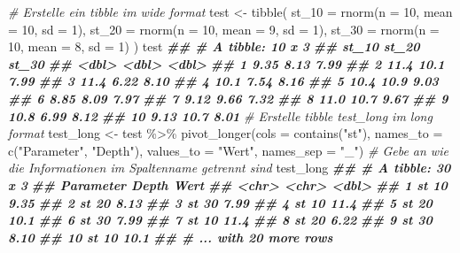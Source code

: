 \documentclass[
]{article}
\newenvironment{Shaded}{\begin{snugshade}}{\end{snugshade}}
\newcommand{\AttributeTok}[1]{\textcolor[rgb]{0.77,0.63,0.00}{#1}}
\newcommand{\CommentTok}[1]{\textcolor[rgb]{0.56,0.35,0.01}{\textit{#1}}}
\newcommand{\DecValTok}[1]{\textcolor[rgb]{0.00,0.00,0.81}{#1}}
\newcommand{\DocumentationTok}[1]{\textcolor[rgb]{0.56,0.35,0.01}{\textbf{\textit{#1}}}}
\newcommand{\FunctionTok}[1]{\textcolor[rgb]{0.00,0.00,0.00}{#1}}
\newcommand{\NormalTok}[1]{#1}
\newcommand{\OtherTok}[1]{\textcolor[rgb]{0.56,0.35,0.01}{#1}}
\newcommand{\SpecialCharTok}[1]{\textcolor[rgb]{0.00,0.00,0.00}{#1}}
\newcommand{\StringTok}[1]{\textcolor[rgb]{0.31,0.60,0.02}{#1}}
\begin{document}
\begin{Shaded}
\begin{Highlighting}[]
\CommentTok{\# Erstelle ein tibble im wide format}
\NormalTok{test }\OtherTok{\textless{}{-}} \FunctionTok{tibble}\NormalTok{(}
  \AttributeTok{st\_10 =} \FunctionTok{rnorm}\NormalTok{(}\AttributeTok{n =} \DecValTok{10}\NormalTok{, }\AttributeTok{mean =} \DecValTok{10}\NormalTok{, }\AttributeTok{sd =} \DecValTok{1}\NormalTok{), }
  \AttributeTok{st\_20 =} \FunctionTok{rnorm}\NormalTok{(}\AttributeTok{n =} \DecValTok{10}\NormalTok{, }\AttributeTok{mean =} \DecValTok{9}\NormalTok{, }\AttributeTok{sd =} \DecValTok{1}\NormalTok{), }
  \AttributeTok{st\_30 =} \FunctionTok{rnorm}\NormalTok{(}\AttributeTok{n =} \DecValTok{10}\NormalTok{, }\AttributeTok{mean =} \DecValTok{8}\NormalTok{, }\AttributeTok{sd =} \DecValTok{1}\NormalTok{) }
\NormalTok{)}
\NormalTok{test}
\DocumentationTok{\#\# \# A tibble: 10 x 3}
\DocumentationTok{\#\#    st\_10 st\_20 st\_30}
\DocumentationTok{\#\#    \textless{}dbl\textgreater{} \textless{}dbl\textgreater{} \textless{}dbl\textgreater{}}
\DocumentationTok{\#\#  1  9.35  8.13  7.99}
\DocumentationTok{\#\#  2 11.4  10.1   7.99}
\DocumentationTok{\#\#  3 11.4   6.22  8.10}
\DocumentationTok{\#\#  4 10.1   7.54  8.16}
\DocumentationTok{\#\#  5 10.4  10.9   9.03}
\DocumentationTok{\#\#  6  8.85  8.09  7.97}
\DocumentationTok{\#\#  7  9.12  9.66  7.32}
\DocumentationTok{\#\#  8 11.0  10.7   9.67}
\DocumentationTok{\#\#  9 10.8   6.99  8.12}
\DocumentationTok{\#\# 10  9.13 10.7   8.01}
\CommentTok{\# Erstelle tibble test\_long im long format}
\NormalTok{test\_long }\OtherTok{\textless{}{-}}\NormalTok{ test }\SpecialCharTok{\%\textgreater{}\%}
  \FunctionTok{pivot\_longer}\NormalTok{(}\AttributeTok{cols =} \FunctionTok{contains}\NormalTok{(}\StringTok{"st"}\NormalTok{), }\AttributeTok{names\_to =} \FunctionTok{c}\NormalTok{(}\StringTok{"Parameter"}\NormalTok{, }\StringTok{"Depth"}\NormalTok{), }\AttributeTok{values\_to =} \StringTok{"Wert"}\NormalTok{, }\AttributeTok{names\_sep =} \StringTok{"\_"}\NormalTok{) }\CommentTok{\# Gebe an wie die Informationen im Spaltenname getrennt sind}
\NormalTok{test\_long}
\DocumentationTok{\#\# \# A tibble: 30 x 3}
\DocumentationTok{\#\#    Parameter Depth  Wert}
\DocumentationTok{\#\#    \textless{}chr\textgreater{}     \textless{}chr\textgreater{} \textless{}dbl\textgreater{}}
\DocumentationTok{\#\#  1 st        10     9.35}
\DocumentationTok{\#\#  2 st        20     8.13}
\DocumentationTok{\#\#  3 st        30     7.99}
\DocumentationTok{\#\#  4 st        10    11.4 }
\DocumentationTok{\#\#  5 st        20    10.1 }
\DocumentationTok{\#\#  6 st        30     7.99}
\DocumentationTok{\#\#  7 st        10    11.4 }
\DocumentationTok{\#\#  8 st        20     6.22}
\DocumentationTok{\#\#  9 st        30     8.10}
\DocumentationTok{\#\# 10 st        10    10.1 }
\DocumentationTok{\#\# \# ... with 20 more rows}
\end{Highlighting}
\end{Shaded}
\end{document}
